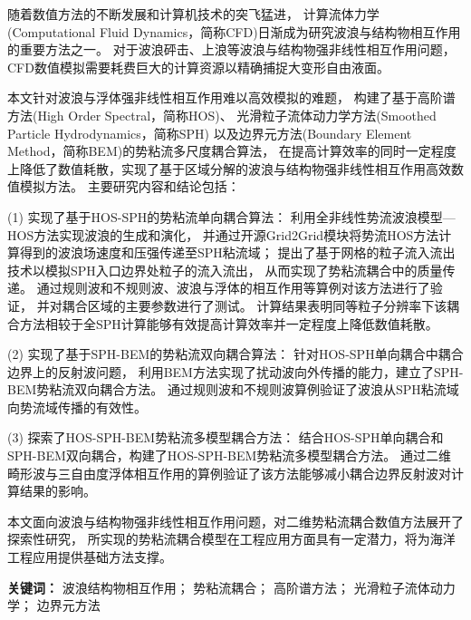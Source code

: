 \begin{cnabstract}
\label{sec:cnabstract}

随着数值方法的不断发展和计算机技术的突飞猛进，
计算流体力学(Computational Fluid Dynamics，简称CFD)日渐成为研究波浪与结构物相互作用的重要方法之一。
对于波浪砰击、上浪等波浪与结构物强非线性相互作用问题，
CFD数值模拟需要耗费巨大的计算资源以精确捕捉大变形自由液面。

本文针对波浪与浮体强非线性相互作用难以高效模拟的难题，
构建了基于高阶谱方法(High Order Spectral，简称HOS)、
光滑粒子流体动力学方法(Smoothed Particle Hydrodynamics，简称SPH)
以及边界元方法(Boundary Element Method，简称BEM)的势粘流多尺度耦合算法，
在提高计算效率的同时一定程度上降低了数值耗散，实现了基于区域分解的波浪与结构物强非线性相互作用高效数值模拟方法。
主要研究内容和结论包括：

(1) 实现了基于HOS-SPH的势粘流单向耦合算法：
利用全非线性势流波浪模型—HOS方法实现波浪的生成和演化，
并通过开源Grid2Grid模块将势流HOS方法计算得到的波浪场速度和压强传递至SPH粘流域；
提出了基于网格的粒子流入流出技术以模拟SPH入口边界处粒子的流入流出，
从而实现了势粘流耦合中的质量传递。
通过规则波和不规则波、波浪与浮体的相互作用等算例对该方法进行了验证，
并对耦合区域的主要参数进行了测试。
计算结果表明同等粒子分辨率下该耦合方法相较于全SPH计算能够有效提高计算效率并一定程度上降低数值耗散。

(2) 实现了基于SPH-BEM的势粘流双向耦合算法：
针对HOS-SPH单向耦合中耦合边界上的反射波问题，
利用BEM方法实现了扰动波向外传播的能力，建立了SPH-BEM势粘流双向耦合方法。
通过规则波和不规则波算例验证了波浪从SPH粘流域向势流域传播的有效性。

(3) 探索了HOS-SPH-BEM势粘流多模型耦合方法：
结合HOS-SPH单向耦合和SPH-BEM双向耦合，构建了HOS-SPH-BEM势粘流多模型耦合方法。
通过二维畸形波与三自由度浮体相互作用的算例验证了该方法能够减小耦合边界反射波对计算结果的影响。

本文面向波浪与结构物强非线性相互作用问题，对二维势粘流耦合数值方法展开了探索性研究，
所实现的势粘流耦合模型在工程应用方面具有一定潜力，将为海洋工程应用提供基础方法支撑。

\par\mbox{}\par %
\textbf{关键词：}
波浪结构物相互作用；
势粘流耦合；
高阶谱方法；
光滑粒子流体动力学；
边界元方法 

\end{cnabstract}

\newoddpage %

